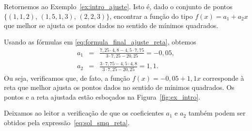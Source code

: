 \begin{ex}\label{ex:calculo_intro_ajuste}
  Retornemos ao Exemplo~\ref{ex:intro_ajuste}. Isto é, dado o conjunto de pontos $\{(1, 1,2)$, $(1,5, 1,3)$, $(2, 2,3)\}$, encontrar a função do tipo $f(x) = a_1 + a_2x$ que melhor se ajusta os pontos dados no sentido de mínimos quadrados.
\end{ex}
\begin{sol} Usando as fórmulas em \eqref{eq:formula_final_ajuste_reta}, obtemos
  \begin{eqnarray}
    a_1&=&\frac{7,25 \cdot 4,8 - 4,5 \cdot 7,75  }{3\cdot 7,25 - 20,25 } = -0,05, \\
    a_2&=&\frac{3\cdot 7,75 - 4,5\cdot 4,8}{3\cdot 7,25 - 20,25}=1,1.
  \end{eqnarray}
Ou seja, verificamos que, de fato, a função $f(x) = -0,05 + 1,1x$ corresponde à reta que melhor ajusta os pontos dados no sentido de mínimos quadrados. Os pontos e a reta ajustada estão esboçados na Figura~\ref{fig:ex_intro}.

Deixamos ao leitor a verificação de que os coeficientes $a_1$ e $a_2$ também podem ser obtidos pela expressão~\eqref{eq:sol_smq_reta}.


\end{sol}
